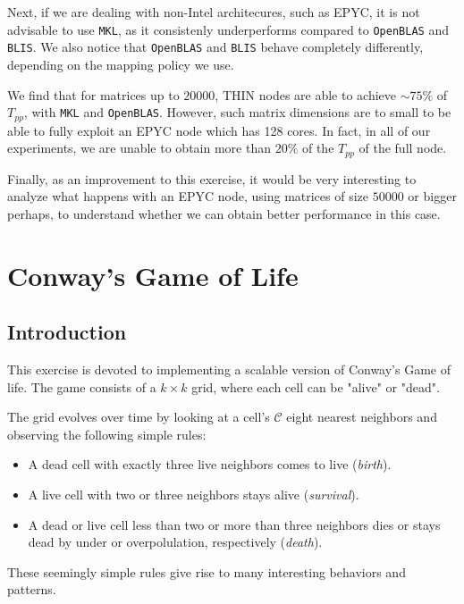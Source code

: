 \documentclass{report}
\begin{document}
Next, if we are dealing with non-Intel architecures, such as EPYC, it is not 
advisable to use \texttt{MKL}, as it consistenly underperforms compared to 
\texttt{OpenBLAS} and \texttt{BLIS}. We also notice that \texttt{OpenBLAS} and 
\texttt{BLIS} behave completely differently, depending on the mapping policy we 
use.

We find that for matrices up to $20000$, THIN nodes are able to achieve 
$\sim 75\%$ of $T_{pp}$, with \texttt{MKL} and \texttt{OpenBLAS}. However, 
such matrix dimensions are to small to be able to fully exploit an EPYC node 
which has 128 cores. In fact, in all of our experiments, we are unable to obtain 
more than $20\%$ of the $T_{pp}$ of the full node.

Finally, as an improvement to this exercise, it would be very interesting to 
analyze what happens with an EPYC node, using matrices of size $50000$ or bigger 
perhaps, to understand whether we can obtain better performance in this case.

\chapter{Conway's Game of Life}


\section{Introduction}

This exercise is devoted to implementing a scalable version of Conway's Game of 
life\cite{conway}. The game consists of a $k\times k$ grid, where each cell can 
be "alive" or "dead".

The grid evolves over time by looking at a cell's $\mathcal{C}$ eight nearest 
neighbors and observing the following simple rules: 

\begin{itemize}
    \item A dead cell with exactly three live neighbors comes to live (\textit{birth}).
    \item A live cell with two or three neighbors stays alive (\textit{survival}).
    \item A dead or live cell less than two or more than three neighbors dies 
        or stays dead by under or overpolulation, respectively (\textit{death}).
\end{itemize}

These seemingly simple rules give rise to many interesting behaviors and patterns.
\end{document}
